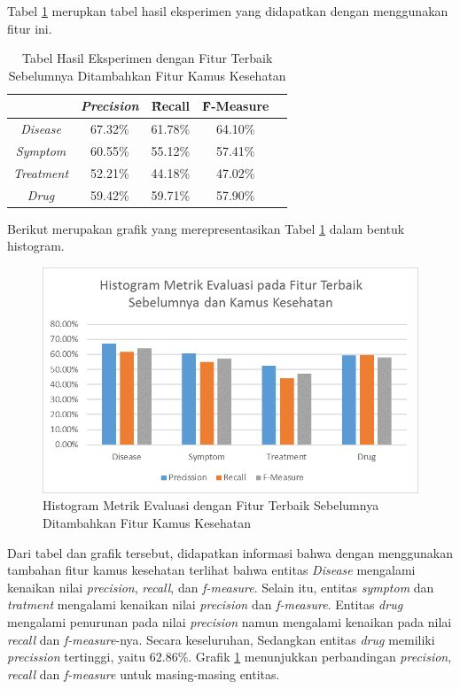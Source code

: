 	Tabel \ref{table:owndict2} merupkan tabel hasil eksperimen yang didapatkan dengan menggunakan fitur ini.
	
	\begin{table}
		\centering
		\caption{Tabel Hasil Eksperimen dengan Fitur Terbaik Sebelumnya Ditambahkan Fitur Kamus Kesehatan}
		\begin{tabular}{|c|c|c|c|c|}
			\hline
			                      & \textit{Precision} & \f{\f{Recall}} & \f{\f{F-Measure}} \\ \hline
			\textit{Disease}      & 67.32\%             & 61.78\%        & 64.10\%           \\ \hline
			\textit{Symptom}      & 60.55\%             & 55.12\%        & 57.41\%           \\ \hline
			\textit{Treatment}    & 52.21\%             & 44.18\%        & 47.02\%           \\ \hline
			\textit{Drug}		  & 59.42\%             & 59.71\%        & 57.90\%           \\ \hline
		\end{tabular}
		\label{table:owndict2}
	\end{table}
	
	Berikut merupakan grafik yang merepresentasikan Tabel \ref{table:owndict2} dalam bentuk histogram.
	
	\begin{figure}
		\centering
		\includegraphics[width=0.85\linewidth]{images/histogram2}
		\caption{Histogram Metrik Evaluasi dengan Fitur Terbaik Sebelumnya Ditambahkan Fitur Kamus Kesehatan}
		\label{fig:owndict2}
	\end{figure}

	Dari tabel dan grafik tersebut, didapatkan informasi bahwa dengan menggunakan tambahan fitur kamus kesehatan terlihat bahwa entitas \textit{Disease} mengalami kenaikan nilai \textit{precision}, \textit{recall}, dan \textit{f-measure}. Selain itu, entitas \textit{symptom} dan \textit{tratment} mengalami kenaikan nilai \textit{precision} dan \textit{f-measure}. Entitas \textit{drug} mengalami penurunan pada nilai \textit{precision} namun mengalami kenaikan pada nilai \textit{recall} dan \textit{f-measure}-nya. Secara keseluruhan,  Sedangkan entitas \textit{drug} memiliki \textit{precission} tertinggi, yaitu 62.86\%. Grafik \ref{fig:owndict2} menunjukkan perbandingan \textit{precision}, \textit{recall} dan \textit{f-measure} untuk masing-masing entitas.

